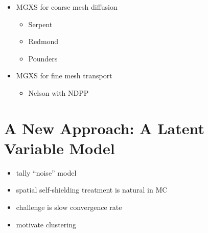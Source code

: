 \begin{itemize}[noitemsep]
  \item \ac{MGXS} for coarse mesh diffusion
  \begin{itemize}[noitemsep]
    \item Serpent
    \item Redmond
    \item Pounders
  \end{itemize}
  \item \ac{MGXS} for fine mesh transport
  \begin{itemize}[noitemsep]
    \item Nelson with NDPP
  \end{itemize}
\end{itemize}


\section{A New Approach: A Latent Variable Model}
\label{sec:chap3-latent-variables}

\begin{itemize}[noitemsep]
  \item tally ``noise'' model
  \item spatial self-shielding treatment is natural in \ac{MC}
  \item challenge is slow convergence rate
  \item motivate clustering
\end{itemize}